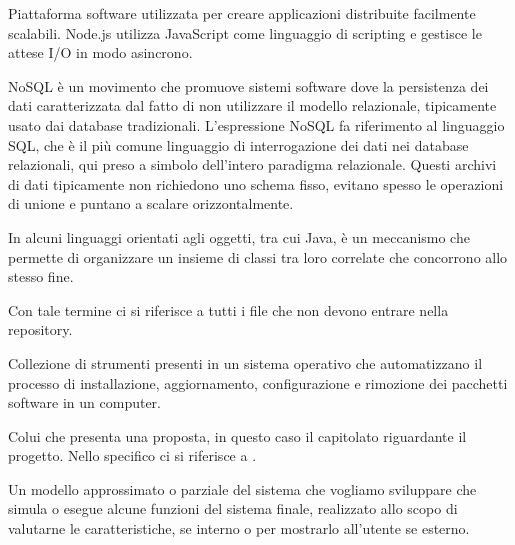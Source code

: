 \begin{itemize}


Piattaforma software utilizzata per creare applicazioni distribuite facilmente scalabili.
Node.js utilizza JavaScript come linguaggio di scripting e gestisce le attese I/O in modo asincrono.


NoSQL è un movimento che promuove sistemi software dove la persistenza dei dati caratterizzata dal fatto di non utilizzare il modello relazionale, tipicamente usato dai database tradizionali. L'espressione NoSQL fa riferimento al linguaggio SQL, che è il più comune linguaggio di interrogazione dei dati nei database relazionali, qui preso a simbolo dell'intero paradigma relazionale.
Questi archivi di dati tipicamente non richiedono uno schema fisso, evitano spesso le operazioni di unione e puntano a scalare orizzontalmente.

\end{itemize}


\begin{itemize}


In alcuni linguaggi orientati agli oggetti, tra cui Java, è un meccanismo che permette di organizzare un insieme di classi tra loro correlate che concorrono allo stesso fine.





Con tale termine ci si riferisce a tutti i file che non devono entrare nella repository.


Collezione di strumenti presenti in un sistema operativo che automatizzano il processo di installazione, aggiornamento, configurazione e rimozione dei pacchetti software in un computer.


Colui che presenta una proposta, in questo caso il capitolato riguardante il progetto.
Nello specifico ci si riferisce a \Proponente{}.


Un modello approssimato o parziale del sistema che vogliamo sviluppare che simula o esegue alcune funzioni del sistema finale, realizzato allo scopo di valutarne le caratteristiche, se interno o per mostrarlo all'utente se esterno.

\end{itemize}

